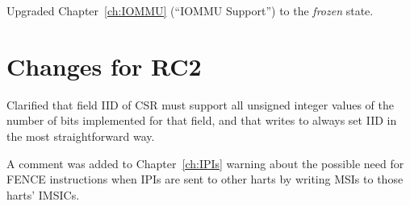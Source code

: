 Upgraded Chapter~\ref{ch:IOMMU} (``IOMMU Support'')
to the \emph{frozen} state.

\section*{Changes for RC2}

Clarified that
field IID of CSR  must support all
unsigned integer values of the number of bits implemented
for that field, and that writes to 
always set IID in the most straightforward way.

A comment was added to Chapter~\ref{ch:IPIs} warning about
the possible need for FENCE instructions when IPIs are
sent to other harts by writing MSIs to those harts' IMSICs.

